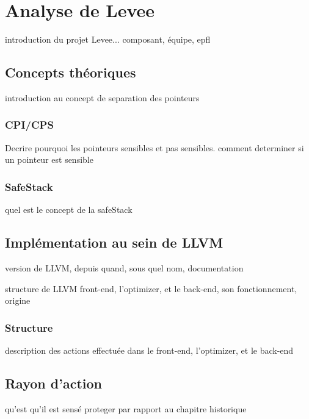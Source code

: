 \chapter{Analyse de Levee}
\label{chap:levee}

introduction du projet Levee... composant, équipe, epfl

\minitoc

\newpage

\section{Concepts théoriques}

introduction au concept de separation des pointeurs

\subsection{CPI/CPS}

Decrire pourquoi les pointeurs sensibles et pas sensibles. comment determiner si un pointeur est sensible

\subsection{SafeStack}

quel est le concept de la safeStack

\section{Implémentation au sein de LLVM}

version de LLVM, depuis quand, sous quel nom, documentation

structure de LLVM front-end, l'optimizer, et le back-end, son fonctionnement, origine

\subsection{Structure}

description des actions effectuée dans le front-end, l'optimizer, et le back-end

\section{Rayon d'action}

qu'est qu'il est sensé proteger par rapport au chapitre historique
